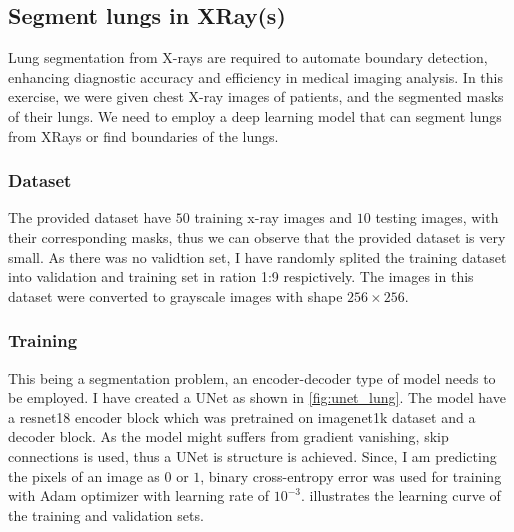\subsection{Segment lungs in XRay(s)}
\label{sec:warmup5}

    Lung segmentation from X-rays are required to automate boundary detection, enhancing diagnostic accuracy and efficiency in medical imaging analysis. In this exercise, we were given chest X-ray images of patients, and the segmented masks of their lungs. We need to employ a deep learning model that can segment lungs from XRays or find boundaries of the lungs.

\subsubsection{Dataset}

    The provided dataset have $50$ training x-ray images and $10$ testing images, with their corresponding masks, thus we can observe that the provided dataset is very small. As there was no validtion set, I have randomly splited the training dataset into validation and training set in ration 1:9 respictively. The images in this dataset were converted to grayscale images with shape $256 \times 256$.

\subsubsection{Training}

    This being a segmentation problem, an encoder-decoder type of model needs to be employed. I have created a UNet as shown in \cref{fig:unet_lung}. The model have a resnet18 encoder block which was pretrained on imagenet1k dataset and a decoder block. As the model might suffers from gradient vanishing, skip connections is used, thus a UNet is structure is achieved. Since, I am predicting the pixels of an image as $0$ or $1$, binary cross-entropy error was used for training with Adam optimizer with learning rate of $10^{-3}$.  illustrates the learning curve of the training and validation sets.

